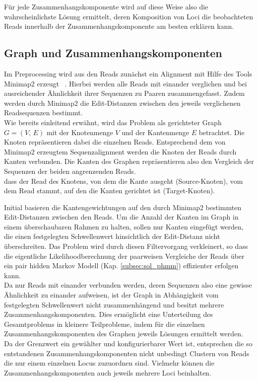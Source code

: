 Für jede Zusammenhangskomponente wird auf diese Weise also die wahrscheinlichste Lösung ermittelt, deren Komposition von Loci die beobachteten Reads innerhalb der Zusammenhangskomponente am besten erklären kann. \\


\subsection{Graph und Zusammenhangskomponenten} \label{subsec:sol_graph}

Im Preprocessing wird aus den Reads zunächst ein Alignment mit Hilfe des Tools Minimap2  erzeugt ~\cite{li_2018}. Hierbei werden alle Reads mit einander verglichen und bei ausreichender Ähnlichkeit ihrer Sequenzen zu Paaren zusammengefasst. Zudem werden durch Minimap2 die Edit-Distanzen zwischen den jeweils verglichenen Readsequenzen bestimmt. \\

Wie bereits einleitend erwähnt, wird das Problem als gerichteter Graph $G=(V, \, E)$ mit der Knotenmenge $V$ und der Kantenmenge $E$ betrachtet. Die Knoten repräsentieren dabei die einzelnen Reads. Entsprechend dem von Minimap2 erzeugtem Sequenzalignment werden die Knoten der Reads durch Kanten verbunden. Die Kanten des Graphen repräsentieren also den Vergleich der Sequenzen der beiden angrenzenden Reads.\\dass der Read des Knotens, von dem die Kante ausgeht (Source-Knoten), vom dem Read stammt, auf den die Kanten gerichtet ist (Target-Knoten).

Initial basieren die Kantengewichtungen auf den durch Minimap2 bestimmten Edit-Distanzen zwischen den Reads. Um die Anzahl der Kanten im Graph in einem überschaubaren Rahmen zu halten, sollen nur Kanten eingefügt werden, die einen festgelegten Schwellenwert hinsichtlich der Edit-Distanz nicht überschreiten. Das Problem wird durch diesen Filtervorgang verkleinert, so dass die eigentliche Likelihoodberechnung der paarweisen Vergleiche der Reads über ein pair hidden Markov Modell (Kap. \ref{subsec:sol_phmm}) effizienter erfolgen kann. \\

Da nur Reads mit einander verbunden werden, deren Sequenzen also eine gewisse Ähnlichkeit zu einander aufweisen, ist der Graph in Abhängigkeit vom festgelegten Schwellenwert nicht zusammenhängend und besitzt mehrere Zusammenhangskomponenten. Dies ermöglicht eine Unterteilung des Gesamtproblems in kleinere Teilprobleme, indem für die einzelnen Zusammenhangskomponenten des Graphen jeweils Lösungen ermittelt werden. Da der Grenzwert ein gewählter und konfigurierbarer Wert ist, entsprechen die so entstandenen Zusammenhangskomponenten nicht unbedingt Clustern von Reads die nur einem einzelnen Locus zuzuordnen sind. Vielmehr können die Zusammenhangskomponenten auch jeweils mehrere Loci beinhalten. 

